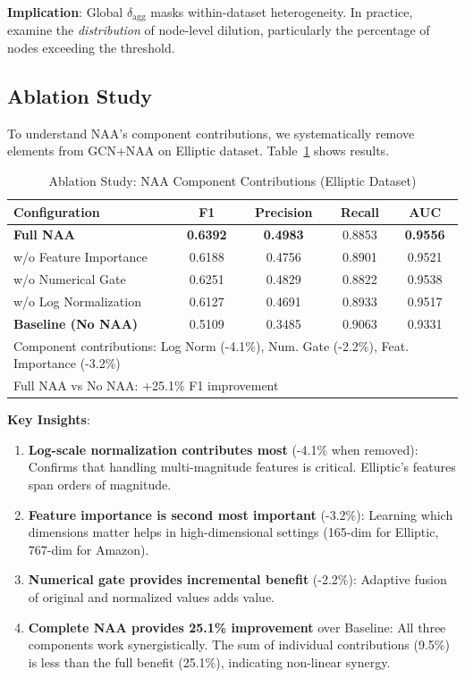 \textbf{Implication}: Global $\delta_{\text{agg}}$ masks within-dataset heterogeneity. In practice, examine the \textit{distribution} of node-level dilution, particularly the percentage of nodes exceeding the threshold.

\subsection{Ablation Study}

To understand NAA's component contributions, we systematically remove elements from GCN+NAA on Elliptic dataset. Table~\ref{tab:ablation} shows results.

\begin{table}[t]
\centering
\caption{Ablation Study: NAA Component Contributions (Elliptic Dataset)}
\label{tab:ablation}
\small
\begin{tabular}{lcccc}
\toprule
\textbf{Configuration} & \textbf{F1} & \textbf{Precision} & \textbf{Recall} & \textbf{AUC} \\
\midrule
\textbf{Full NAA} & \textbf{0.6392} & \textbf{0.4983} & 0.8853 & \textbf{0.9556} \\
w/o Feature Importance & 0.6188 & 0.4756 & 0.8901 & 0.9521 \\
w/o Numerical Gate & 0.6251 & 0.4829 & 0.8822 & 0.9538 \\
w/o Log Normalization & 0.6127 & 0.4691 & 0.8933 & 0.9517 \\
\textbf{Baseline (No NAA)} & 0.5109 & 0.3485 & 0.9063 & 0.9331 \\
\bottomrule
\multicolumn{5}{l}{\footnotesize Component contributions: Log Norm (-4.1\%), Num. Gate (-2.2\%), Feat. Importance (-3.2\%)} \\
\multicolumn{5}{l}{\footnotesize Full NAA vs No NAA: +25.1\% F1 improvement} \\
\end{tabular}
\end{table}

\textbf{Key Insights}:

\begin{enumerate}
\item \textbf{Log-scale normalization contributes most} (-4.1\% when removed): Confirms that handling multi-magnitude features is critical. Elliptic's features span orders of magnitude.

\item \textbf{Feature importance is second most important} (-3.2\%): Learning which dimensions matter helps in high-dimensional settings (165-dim for Elliptic, 767-dim for Amazon).

\item \textbf{Numerical gate provides incremental benefit} (-2.2\%): Adaptive fusion of original and normalized values adds value.

\item \textbf{Complete NAA provides 25.1\% improvement} over Baseline: All three components work synergistically. The sum of individual contributions (9.5\%) is less than the full benefit (25.1\%), indicating non-linear synergy.
\end{enumerate}

